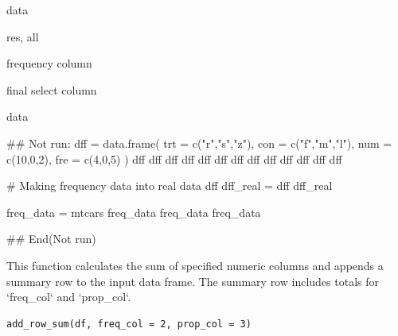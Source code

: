 \documentclass[a4paper]{book}
\begin{document}
%
\begin{Arguments}
\begin{ldescription}
\item[\code{data}] data

\item[\code{type}] res, all

\item[\code{sel}] frequency column

\item[\code{fix}] final select column
\end{ldescription}
\end{Arguments}
%
\begin{Value}
data
\end{Value}
%
\begin{Examples}
\begin{ExampleCode}

\#\# Not run: 
dff = data.frame(
  trt = c("r","s","z"),
  con = c("f","m","l"),
  num = c(10,0,2),
  fre = c(4,0,5) )
dff
dff %
dff %
dff %
dff %
dff %
dff %
dff %
dff %
dff %
dff %
dff %
dff %


# Making frequency data into real data
dff %
 dff_real =  dff %
 dff_real


 freq_data =  mtcars %
 freq_data%
 freq_data%
 freq_data%



## End(Not run)


\end{ExampleCode}
\end{Examples}
%
\begin{Description}
This function calculates the sum of specified numeric columns and appends a summary row
to the input data frame. The summary row includes totals for `freq\_col` and `prop\_col`.
\end{Description}
%
\begin{Usage}
\begin{verbatim}
add_row_sum(df, freq_col = 2, prop_col = 3)
\end{verbatim}
\end{Usage}
\end{document}
